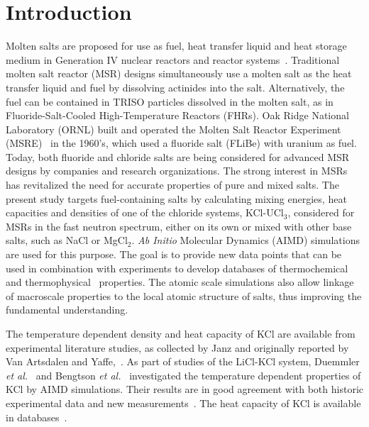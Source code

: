 \documentclass[preprint,3p,10pt,twocolumn,number,sort&compress]{elsarticle}
\begin{document}

\section{Introduction}
\label{sec:intro}
Molten salts are proposed for use as fuel, heat transfer liquid and heat storage medium in Generation IV nuclear reactors and reactor systems~\cite{SERP2014308}. Traditional molten salt reactor (MSR) designs simultaneously use a molten salt as the heat transfer liquid and fuel by dissolving actinides into the salt. Alternatively, the fuel can be contained in TRISO particles dissolved in the molten salt, as in Fluoride-Salt-Cooled High-Temperature Reactors (FHRs).  
Oak Ridge National Laboratory (ORNL) built and operated the Molten Salt Reactor Experiment (MSRE)~\cite{MSRE1,MSRE2} in the 1960's, which used a fluoride salt (FLiBe) with uranium as fuel. 
Today, both fluoride and chloride salts are being considered for advanced MSR designs by companies and research organizations. 
The strong interest in MSRs has revitalized the need for accurate properties of pure and mixed salts. The present study targets fuel-containing salts by calculating mixing energies, heat capacities and densities of one of the chloride systems, KCl-UCl$_3$, considered for MSRs in the fast neutron spectrum, either on its own or mixed with other base salts, such as NaCl or MgCl$_2$. \textit{Ab Initio} Molecular Dynamics (AIMD) simulations are used for this purpose. 
The goal is to provide new data points that can be used in combination with experiments to develop databases of thermochemical~\cite{ARD2022153631} and thermophysical~\cite{BIRRI2022117954} properties. The atomic scale simulations also allow linkage of macroscale properties to the local atomic structure of salts, thus improving the fundamental understanding.   

The temperature dependent density and heat capacity of KCl are available from experimental literature studies, as collected by Janz \cite{Janz1988} and originally reported by Van Artsdalen and Yaffe,~\cite{Artsdalen1955}.  
As part of studies of the LiCl-KCl system, Duemmler \textit{et al.}~\cite{DUEMMLER2022153414} and Bengtson \textit{et al.}~\cite{BENGTSON2014362} investigated the temperature dependent properties of KCl by AIMD simulations. 
Their results are in good agreement with both historic experimental data and new measurements~\cite{Artsdalen1955,DUEMMLER2022153414}. The heat capacity of KCl is available in databases~\cite{NIST,219851}. 
\end{document}
